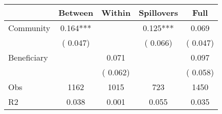 
\begin{tabular}{l*{4}{c}}\hline&\multicolumn{1}{c}{Between}&\multicolumn{1}{c}{Within}&\multicolumn{1}{c}{Spillovers}&\multicolumn{1}{c}{Full}\\ \hline
 Community             &              0.164***      &                                               &        0.125*** &         0.069                            \\ 
                               &        (       0.047)           &                                       &       (       0.066)     &      (       0.047)                                           \\ 
 Beneficiary   &                                               &        0.071    &                                &             0.097                            \\ 
                               &                                               & (       0.062)                  &                                        &      (       0.058)                                           \\ 
\hline                                                                                                                                                                                                                                            
 Obs                   &               1162               &       1015                       &       723                &              1450                                               \\ 
 R2                    &                      0.038              &              0.001                      &              0.055               &                     0.035                                              \\ 
\hline \end{tabular}                                                                                                                                                                                                              